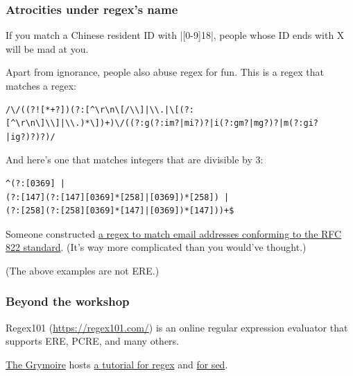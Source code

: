 \begin{frame}[fragile]
\frametitle{Atrocities under regex's name}
If you match a Chinese resident ID with \cverb|[0-9]{18}|, people whose
ID ends with X will be mad at you.

Apart from ignorance, people also abuse regex for fun. This is a regex
that matches a regex:
\begin{lstlisting}
/\/((?![*+?])(?:[^\r\n\[/\\]|\\.|\[(?:[^\r\n\]\\]|\\.)*\])+)\/((?:g(?:im?|mi?)?|i(?:gm?|mg?)?|m(?:gi?|ig?)?)?)/
\end{lstlisting}

And here's one that matches integers that are divisible by 3:
\begin{lstlisting}
^(?:[0369] |
(?:[147](?:[147][0369]*[258]|[0369])*[258]) |
(?:[258](?:[258][0369]*[147]|[0369])*[147]))+$
\end{lstlisting}

Someone constructed \href{https://pdw.ex-parrot.com/Mail-RFC822-Address.html}
{a regex to match email addresses conforming to the RFC 822 standard}. (It's
way more complicated than you would've thought.)

(The above examples are not ERE.)
\end{frame}

\begin{frame}
\frametitle{Beyond the workshop}
Regex101 (\url{https://regex101.com/}) is an online regular expression
evaluator that supports ERE, PCRE, and many others.

\href{https://www.grymoire.com/index.html}{The Grymoire} hosts
\href{https://www.grymoire.com/Unix/Regular.html}{a tutorial for regex}
and \href{https://www.grymoire.com/Unix/Sed.html}{for sed}.
\end{frame}
